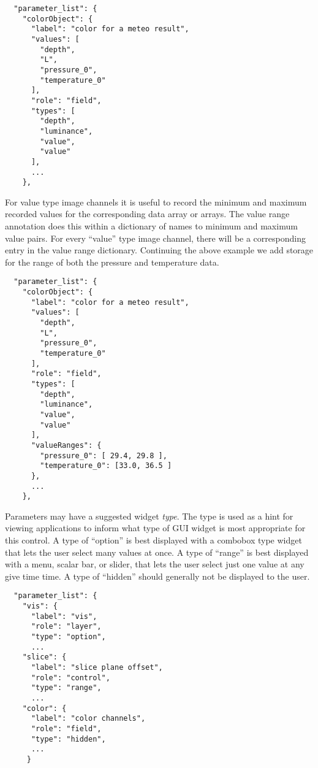 \begin{verbatim}
  "parameter_list": {
    "colorObject": {
      "label": "color for a meteo result",
      "values": [
        "depth",
        "L",
        "pressure_0",
        "temperature_0"
      ],
      "role": "field",
      "types": [
        "depth",
        "luminance",
        "value",
        "value"
      ],
      ...
    },

\end{verbatim}


For value type image channels it is useful to record the minimum and
maximum recorded values for the corresponding data array or
arrays. The value range annotation does this within a dictionary of
names to minimum and maximum value pairs. For every ``value'' type image channel, there will be a
corresponding entry in the value range dictionary. Continuing the
above example we add storage for the range of both the pressure
and temperature data.

\begin{verbatim}
  "parameter_list": {
    "colorObject": {
      "label": "color for a meteo result",
      "values": [
        "depth",
        "L",
        "pressure_0",
        "temperature_0"
      ],
      "role": "field",
      "types": [
        "depth",
        "luminance",
        "value",
        "value"
      ],
      "valueRanges": {
        "pressure_0": [ 29.4, 29.8 ],
        "temperature_0": [33.0, 36.5 ]
      },
      ...
    },
\end{verbatim}


Parameters may have a suggested widget \textit{type}. The type is used as
a hint for viewing applications to inform what type of GUI widget is most
appropriate for this control. A type of ``option''
is best displayed with a combobox type widget that lets the user select many
values at once. A type of ``range'' is best displayed with a menu,
scalar bar, or slider, that lets the user select just one value
at any give time time.  A type of ``hidden'' should generally not be
displayed to the user.

\begin{verbatim}
  "parameter_list": {
    "vis": {
      "label": "vis",
      "role": "layer",
      "type": "option",
      ...
    "slice": {
      "label": "slice plane offset",
      "role": "control",
      "type": "range",
      ...
    "color": {
      "label": "color channels",
      "role": "field",
      "type": "hidden",
      ...
     }
\end{verbatim}

